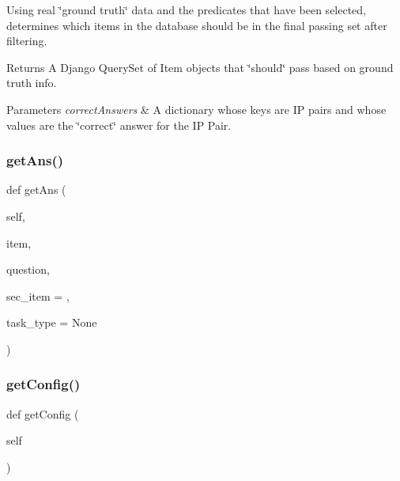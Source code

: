 Using real \char`\"{}ground truth\char`\"{} data and the predicates that have been selected, determines which items in the database should be in the final passing set after filtering. 

\begin{DoxyReturn}{Returns}
A Django Query\+Set of Item objects that \char`\"{}should\char`\"{} pass based on ground truth info. 
\end{DoxyReturn}

\begin{DoxyParams}{Parameters}
{\em correct\+Answers} & A dictionary whose keys are IP pairs and whose values are the \char`\"{}correct\char`\"{} answer for the IP Pair. \\
\hline
\end{DoxyParams}
\mbox{\label{classdynamicfilterapp_1_1test__simulations_1_1_simulation_test_ae53b544987bdb14f48c8b971b3934aea}} 
\subsubsection{\texorpdfstring{getAns()}{getAns()}}
{\footnotesize\ttfamily def get\+Ans (\begin{DoxyParamCaption}\item[{}]{self,  }\item[{}]{item,  }\item[{}]{question,  }\item[{}]{sec\+\_\+item = {\ttfamily \textquotesingle{}\textquotesingle{}},  }\item[{}]{task\+\_\+type = {\ttfamily \textquotesingle{}None\textquotesingle{}} }\end{DoxyParamCaption})}

\mbox{\label{classdynamicfilterapp_1_1test__simulations_1_1_simulation_test_aea39a5bc56255534b42d16cfeab23aca}} 
\subsubsection{\texorpdfstring{getConfig()}{getConfig()}}
{\footnotesize\ttfamily def get\+Config (\begin{DoxyParamCaption}\item[{}]{self }\end{DoxyParamCaption})}


